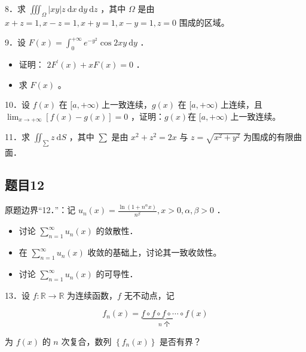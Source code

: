 \documentclass{article}
\begin{document}
8．求 \(\iiint_{\Omega}|x y| z \mathrm{~d} x \mathrm{~d} y \mathrm{~d} z\) ，其中 \(\Omega\) 是由 \(x+z=1, x-z=1, x+y=1, x-y=1, z=0\) 围成的区域。

9．设 \(F(x)=\int_{0}^{+\infty} e^{-y^{2}} \cos 2 x y \mathrm{~d} y\) ．

\begin{itemize}
  \item[（1）] 证明： \(2 F^{\prime}(x)+x F(x)=0\) ．
  \item[（2）] 求 \(F(x)\) 。
\end{itemize}

10．设 \(f(x)\) 在 \([a,+\infty)\) 上一致连续，\(g(x)\) 在 \([a,+\infty)\) 上连续，且 \(\lim _{x \rightarrow+\infty}[f(x)-g(x)]=0\) ，证明：\(g(x)\)在 \([a,+\infty)\) 上一致连续。

11．求 \(\iint_{\sum} z \mathrm{~d} S\) ，其中 \(\sum\) 是由 \(x^{2}+z^{2}=2 x\) 与 \(z=\sqrt{x^{2}+y^{2}}\) 为围成的有限曲面．

\begin{itemize}
\end{itemize}

\subsection{题目12}
原题边界“12．”：记 \(u_{n}(x)=\frac{\ln \left(1+n^{\alpha} x\right)}{n^{\beta}}, x>0, \alpha, \beta>0\) ．

\begin{itemize}
\item[（1）] 讨论 \(\sum_{n=1}^{\infty} u_{n}(x)\) 的敛散性．
  \item[（2）] 在 \(\sum_{n=1}^{\infty} u_{n}(x)\) 收敛的基础上，讨论其一致收敛性。
  \item[（3）] 讨论 \(\sum_{n=1}^{\infty} u_{n}(x)\) 的可导性．
\end{itemize}

13．设 \(f: \mathbb{R} \rightarrow \mathbb{R}\) 为连续函数，\(f\) 无不动点，记

\[
f_{n}(x)=\underbrace{f \circ f \circ f \circ \cdots \circ f}_{n \text { 个 }}(x)
\]

为 \(f(x)\) 的 \(n\) 次复合，数列 \(\left\{f_{n}(x)\right\}\) 是否有界？
\end{document}
